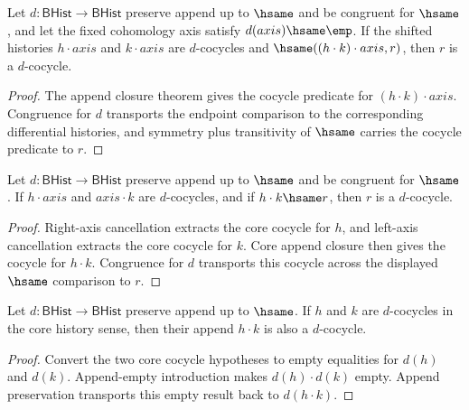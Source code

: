 \begin{theorem}
\label{thm:cohomology-cocycle-append-hsame-transport}
Let $d:\mathsf{BHist}\to\mathsf{BHist}$ preserve append up to $\hsame$ and
be congruent for $\hsame$, and let the fixed cohomology axis satisfy
$d(axis)\hsame\emp$. If the shifted histories $h\cdot axis$ and
$k\cdot axis$ are $d$-cocycles and
$\hsame((h\cdot k)\cdot axis,r)$, then $r$ is a $d$-cocycle.
\end{theorem}
\begin{proof}
The append closure theorem gives the cocycle predicate for
$(h\cdot k)\cdot axis$. Congruence for $d$ transports the endpoint
comparison to the corresponding differential histories, and symmetry plus
transitivity of $\hsame$ carries the cocycle predicate to $r$.
\end{proof}

\begin{theorem}
\label{thm:cohomology-cocycle-mixed-axis-append-hsame-transport}
Let $d:\mathsf{BHist}\to\mathsf{BHist}$ preserve append up to $\hsame$ and
be congruent for $\hsame$. If $h\cdot axis$ and $axis\cdot k$ are
$d$-cocycles, and if $h\cdot k\hsame r$, then $r$ is a $d$-cocycle.
\end{theorem}
\begin{proof}
Right-axis cancellation extracts the core cocycle for $h$, and left-axis
cancellation extracts the core cocycle for $k$. Core append closure then gives
the cocycle for $h\cdot k$. Congruence for $d$ transports this cocycle across
the displayed $\hsame$ comparison to $r$.
\end{proof}

\begin{theorem}
\label{thm:cohomology-cocycle-append-core-closed}
Let $d:\mathsf{BHist}\to\mathsf{BHist}$ preserve append up to $\hsame$. If
$h$ and $k$ are $d$-cocycles in the core history sense, then their append
$h\cdot k$ is also a $d$-cocycle.
\end{theorem}
\begin{proof}
Convert the two core cocycle hypotheses to empty equalities for $d(h)$ and
$d(k)$. Append-empty introduction makes $d(h)\cdot d(k)$ empty. Append
preservation transports this empty result back to $d(h\cdot k)$.
\end{proof}

